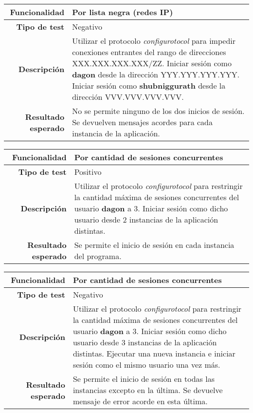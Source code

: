 \documentclass[a4paper,10pt]{article}
\begin{document}
\begin{center}
  \begin{tabular}{|r|p{12.5cm}|}
    \hline
    \textbf{Funcionalidad}	&	Por lista negra (redes IP)\\
    \hline
    \textbf{Tipo de test}	&	Negativo\\
    \hline
    \textbf{Descripción}	&	Utilizar el protocolo \textit{configurotocol} para impedir conexiones
					entrantes del rango de direcciones XXX.XXX.XXX.XXX/ZZ. Iniciar sesión como
					\textbf{dagon} desde la dirección YYY.YYY.YYY.YYY. Iniciar sesión como
					\textbf{shubniggurath} desde la dirección VVV.VVV.VVV.VVV.\\
    \hline
    \textbf{Resultado esperado}	&	No se permite ninguno de los dos inicios de sesión. Se devuelven mensajes
					acordes para cada instancia de la aplicación.\\
    \hline   
  \end{tabular}
\end{center}

\begin{center}
  \begin{tabular}{|r|p{12.5cm}|}
    \hline
    \textbf{Funcionalidad}	&	Por cantidad de sesiones concurrentes\\
    \hline
    \textbf{Tipo de test}	&	Positivo\\
    \hline
    \textbf{Descripción}	&	Utilizar el protocolo \textit{configurotocol} para restringir la cantidad
					máxima de sesiones concurrentes del usuario \textbf{dagon} a 3.
					Iniciar sesión como dicho usuario desde 2 instancias de la aplicación
					distintas.\\
    \hline
    \textbf{Resultado esperado}	&	Se permite el inicio de sesión en cada instancia del programa.\\
    \hline   
  \end{tabular}
\end{center}

\begin{center}
  \begin{tabular}{|r|p{12.5cm}|}
    \hline
    \textbf{Funcionalidad}	&	Por cantidad de sesiones concurrentes\\
    \hline
    \textbf{Tipo de test}	&	Negativo\\
    \hline
    \textbf{Descripción}	&	Utilizar el protocolo \textit{configurotocol} para restringir la cantidad
					máxima de sesiones concurrentes del usuario \textbf{dagon} a 3.
					Iniciar sesión como dicho usuario desde 3 instancias de la aplicación
					distintas. Ejecutar una nueva instancia e iniciar sesión como el mismo
					usuario una vez más.\\
    \hline
    \textbf{Resultado esperado}	&	Se permite el inicio de sesión en todas las instancias excepto en la última.
					Se devuelve mensaje de error acorde en esta última.\\
    \hline   
  \end{tabular}
\end{center}
\end{document}
